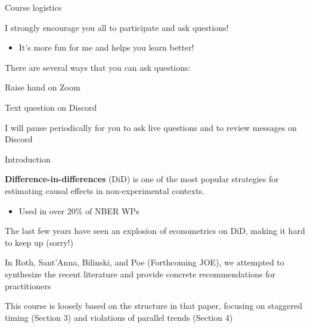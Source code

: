\documentclass[aspectratio = 169, 12pt]{beamer}
\begin{document}
\begin{frame}{Course logistics}
  \begin{wideitemize}
    \item
    I strongly encourage you all to participate and ask questions!
    \begin{itemize}
      \item
            It's more fun for me and helps you learn better!
    \end{itemize}
    \item
    There are several ways that you can ask questions:

    \begin{wideitemize}
      \item
      Raise hand on Zoom

      \item
      Text question on Discord
    \end{wideitemize}

    \item
    I will pause periodically for you to ask live questions and to review messages on Discord
  \end{wideitemize}

\end{frame}


\begin{frame}{Introduction}
  \begin{wideitemize}
    \item
    \textbf{Difference-in-differences} (DiD) is one of the most popular strategies for estimating causal effects in non-experimental contexts.
    \medskip
    \begin{itemize}
      \item
            Used in over 20\% of NBER WPs \citep{currie_technology_2020}
    \end{itemize}

    \item
    The last few years have seen an explosion of econometrics on DiD, making it hard to keep up (sorry!)

    \item
    In Roth, Sant'Anna, Bilinski, and Poe (Forthcoming JOE), we attempted to synthesize the recent literature and provide concrete recommendations for practitioners


    \item
    This course is loosely based on the structure in that paper, focusing on staggered timing (Section 3) and violations of parallel trends (Section 4)
  \end{wideitemize}
\end{frame}
\end{document}
